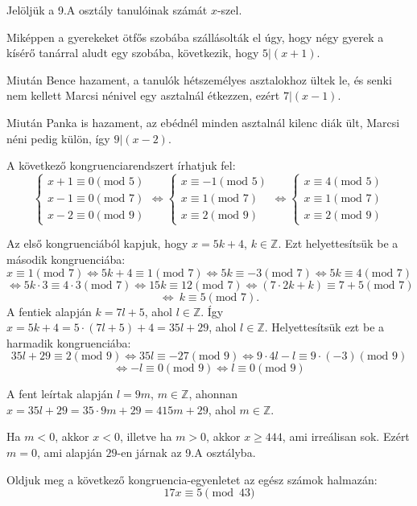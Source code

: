 \begin{solution}
	Jelöljük a 9.A osztály tanulóinak számát $x$-szel.
	
	Miképpen a gyerekeket ötfős szobába szállásolták el úgy, hogy négy
	gyerek a kísérő tanárral aludt egy szobába, következik, hogy $5|(x+1)$.
	
	Miután Bence hazament, a tanulók hétszemélyes asztalokhoz ültek le,
	és senki nem kellett Marcsi nénivel egy asztalnál étkezzen, ezért
	$7|(x-1)$.
	
	Miután Panka is hazament, az ebédnél minden asztalnál kilenc diák
	ült, Marcsi néni pedig külön, így $9|(x-2)$.
	
	A következő kongruenciarendszert írhatjuk fel: 
	\[
	\left\{ \begin{array}{l}
		x+1\equiv0(\text{mod }5)\\
		x-1\equiv0(\text{mod }7)\\
		x-2\equiv0(\text{mod }9)
	\end{array}\right.\Leftrightarrow\left\{ \begin{array}{l}
		x\equiv-1(\text{mod }5)\\
		x\equiv1(\text{mod }7)\\
		x\equiv2(\text{mod }9)
	\end{array}\right.\Leftrightarrow\left\{ \begin{array}{l}
		x\equiv4(\text{mod }5)\\
		x\equiv1(\text{mod }7)\\
		x\equiv2(\text{mod }9)
	\end{array}\right.
	\]
	
	Az első kongruenciából kapjuk, hogy $x=5k+4$, $k\in\mathbb{Z}$.
	Ezt helyettesítsük be a második kongruenciába: 
	\[
	x\equiv1(\text{mod }7)\Leftrightarrow5k+4\equiv1(\text{mod }7)\Leftrightarrow5k\equiv-3(\text{mod }7)\Leftrightarrow5k\equiv4(\text{mod }7)
	\]
	\[
	\Leftrightarrow5k\cdot3\equiv4\cdot3(\text{mod }7)\Leftrightarrow15k\equiv12(\text{mod }7)\Leftrightarrow(7\cdot2k+k)\equiv7+5(\text{mod }7)
	\]
	\[
	\Leftrightarrow\ k\equiv5(\text{mod }7).
	\]
	A fentiek alapján $k=7l+5$, ahol $l\in\mathbb{Z}$. Így $x=5k+4=5\cdot(7l+5)+4=35l+29$,
	ahol $l\in\mathbb{Z}$. Helyettesítsük ezt be a harmadik kongruenciába:
	\[
	35l+29\equiv2(\text{mod }9)\Leftrightarrow35l\equiv-27(\text{mod }9)\Leftrightarrow9\cdot4l-l\equiv9\cdot(-3)(\text{mod }9)
	\]
	\[
	\Leftrightarrow-l\equiv0(\text{mod }9)\Leftrightarrow l\equiv0(\text{mod }9)
	\]
	
	A fent leírtak alapján $l=9m$, $m\in\mathbb{Z}$, ahonnan $x=35l+29=35\cdot9m+29=415m+29$,
	ahol $m\in\mathbb{Z}$.
	
	Ha $m<0$, akkor $x<0$, illetve ha $m>0$, akkor $x\geq444$, ami
	irreálisan sok. Ezért $m=0$, ami alapján $29$-en járnak az 9.A osztályba. 
\end{solution}
\begin{extraproblem}
	Oldjuk meg a következő kongruencia-egyenletet az egész számok halmazán:
	\[
	17x\equiv5\pmod{43}
	\]
\end{extraproblem}


